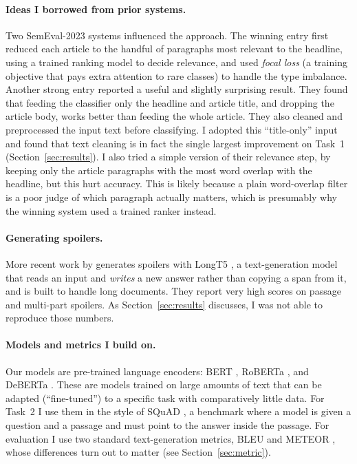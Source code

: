 \documentclass[11pt]{article}
\begin{document}
\paragraph{Ideas I borrowed from prior systems.}
Two SemEval-2023 systems influenced the approach. The winning entry
\citep{billybatson2023} first reduced each article to the handful of paragraphs
most relevant to the headline, using a trained ranking model to decide relevance,
and used \textit{focal loss} \citep{lin2017} (a training objective that pays extra
attention to rare classes) to handle the type imbalance. Another strong entry
\citep{chickadams2023} reported a useful and slightly surprising result. They found that feeding
the classifier only the headline and article title, and dropping the
article body, works better than feeding the whole article. They also cleaned and preprocessed the
input text before classifying. I adopted this ``title-only'' input and found that
text cleaning is in fact the single largest improvement on Task~1
(Section~\ref{sec:results}). I also tried a simple version of their relevance
step, by keeping only the article paragraphs with the most word overlap with the
headline, but this hurt accuracy. This is likely because a plain word-overlap filter is a poor judge of which paragraph actually matters, which is presumably why the winning system used
a trained ranker instead.


\paragraph{Generating spoilers.}
More recent work by \citet{pal2024} generates spoilers with LongT5
\citep{guo2022}, a text-generation model that reads an input and \textit{writes} a
new answer rather than copying a span from it, and is built to handle long
documents. They report very high scores on passage and multi-part spoilers. As
Section~\ref{sec:results} discusses, I was not able to reproduce those numbers.

\paragraph{Models and metrics I build on.}
Our models are pre-trained language encoders: BERT \citep{devlin2019}, RoBERTa
\citep{liu2019}, and DeBERTa \citep{he2021}. These are models trained on large
amounts of text that can be adapted (``fine-tuned'') to a specific task with
comparatively little data. For Task~2 I use them in the style of SQuAD
\citep{rajpurkar2016}, a benchmark where a model is given a question and a
passage and must point to the answer inside the passage. For evaluation I use
two standard text-generation metrics, BLEU \citep{papineni2002} and METEOR
\citep{banerjee2005}, whose differences turn out to matter (see Section~\ref{sec:metric}).
\end{document}

